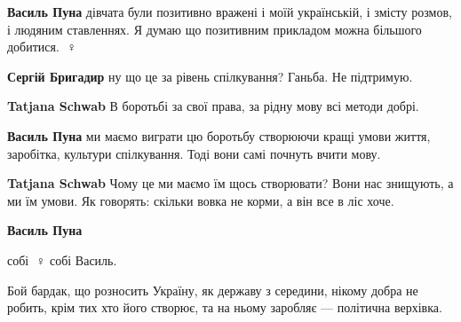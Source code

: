 \begin{itemize}
\begin{itemize}
\textbf{Василь Пуна} дівчата були позитивно вражені і моїй українській, і змісту розмов, і людяним ставленнях. Я думаю що позитивним прикладом можна більшого добитися. 🙋♀️

 
\textbf{Сергій Бригадир} ну що це за рівень спілкування? Ганьба. Не підтримую.

 
\textbf{Tatjana Schwab} В боротьбі за свої права, за рідну мову всі методи добрі.

 
\textbf{Василь Пуна} ми маємо виграти цю боротьбу створюючи кращі умови життя, заробітка, культури спілкування. Тоді вони самі почнуть вчити мову.

 
\textbf{Tatjana Schwab} Чому це ми маємо їм щось створювати? Вони нас знищують, а ми їм умови. Як говорять: скільки вовка не корми, а він все в ліс хоче.

 
\textbf{Василь Пуна} 

собі 🙋♀️ собі Василь.

Бой бардак, що розносить Україну, як державу з середини, нікому добра не
робить, крім тих хто його створює, та на ньому заробляє — політична верхівка.


\end{itemize}
\end{itemize}
